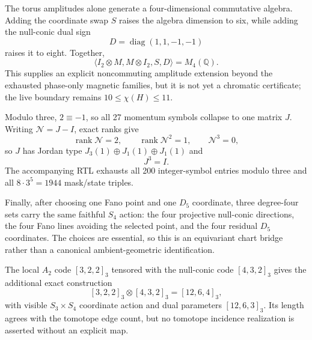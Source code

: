 The torus amplitudes alone generate a four-dimensional commutative algebra.  Adding the coordinate swap $S$ raises the algebra dimension to six, while adding the null-conic dual sign
\[
D=\operatorname{diag}(1,1,-1,-1)
\]
raises it to eight.  Together,
\[
\boxed{\langle I_2\otimes M,M\otimes I_2,S,D\rangle=M_4(\mathbb Q)}.
\]
This supplies an explicit noncommuting amplitude extension beyond the exhausted phase-only magnetic families, but it is not yet a chromatic certificate; the live boundary remains $10\leq\chi(H)\leq11$.

Modulo three, $2\equiv-1$, so all 27 momentum symbols collapse to one matrix $J$.  Writing $\mathcal N=J-I$, exact ranks give
\[
\operatorname{rank}\mathcal N=2,
\qquad
\operatorname{rank}\mathcal N^2=1,
\qquad
\mathcal N^3=0,
\]
so $J$ has Jordan type $J_3(1)\oplus J_1(1)\oplus J_1(1)$ and
\[
\boxed{J^3=I}.
\]
The accompanying RTL exhausts all 200 integer-symbol entries modulo three and all $8\cdot3^5=1944$ mask/state triples.

Finally, after choosing one Fano point and one $D_5$ coordinate, three degree-four sets carry the same faithful $S_4$ action: the four projective null-conic directions, the four Fano lines avoiding the selected point, and the four residual $D_5$ coordinates.  The choices are essential, so this is an equivariant chart bridge rather than a canonical ambient-geometric identification.

The local $A_2$ code $[3,2,2]_3$ tensored with the null-conic code $[4,3,2]_3$ gives the additional exact construction
\[
\boxed{[3,2,2]_3\otimes[4,3,2]_3=[12,6,4]_3},
\]
with visible $S_3\times S_4$ coordinate action and dual parameters $[12,6,3]_3$.  Its length agrees with the tomotope edge count, but no tomotope incidence realization is asserted without an explicit map.
